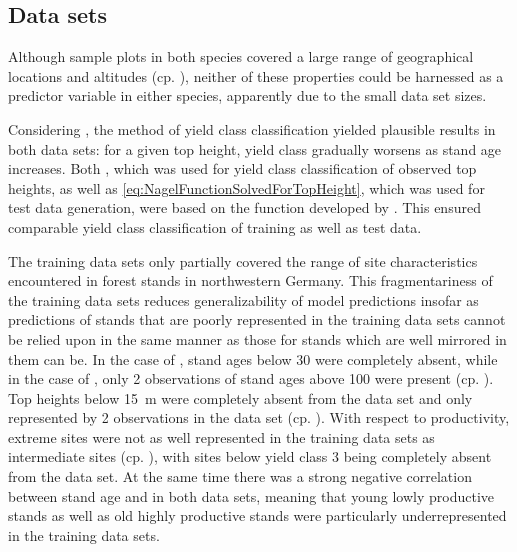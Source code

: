 \subsection{Data sets}

Although sample plots in both species covered a large range of geographical locations and altitudes (cp. ), neither of these properties could be harnessed as a predictor variable in either species, apparently due to the small data set sizes.

Considering , the method of yield class classification yielded plausible results in both data sets:  for a given top height, yield class gradually worsens as stand age increases.  Both , which was used for yield class classification of observed top heights, as well as \eqref{eq:NagelFunctionSolvedForTopHeight}, which was used for test data generation, were based on the function developed by \textcite{Nagel1999}.  This ensured comparable yield class classification of training as well as test data.

The training data sets only partially covered the range of site characteristics encountered in forest stands in northwestern Germany.
This fragmentariness of the training data sets reduces generalizability of model predictions insofar as predictions of stands that are poorly represented in the training data sets cannot be relied upon in the same manner as those for stands which are well mirrored in them can be.
In the case of \Beech{}, stand ages below \SI{30}{\year} were completely absent, while in the case of \Spruce{}, only \num{2} observations of stand ages above \SI{100}{\year} were present (cp. ).
Top heights below \SI{15}{\meter} were completely absent from the \Beech{} data set and only represented by \num{2} observations in the \Spruce{} data set (cp. ).
With respect to productivity, extreme sites were not as well represented in the training data sets as intermediate sites (cp. ), with sites below yield class \num{3} being completely absent from the \Beech{} data set.  At the same time there was a strong negative correlation between stand age and \ProductivityIndexText{} in both data sets, meaning that young lowly productive stands as well as old highly productive stands were particularly underrepresented in the training data sets.

